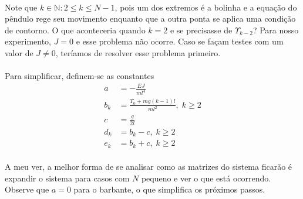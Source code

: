 \documentclass[a4paper,11pt]{scrartcl} %
\numberwithin{equation}{section} %
\numberwithin{figure}{section} %
\numberwithin{table}{section} %
\begin{document}
\paragraph{} Note que $k\in \mathbb{N}:2\le k \le N-1$, pois um dos extremos é a bolinha e a equação do pêndulo rege seu movimento enquanto que a outra ponta se aplica uma condição de contorno. O que aconteceria quando $k=2$ e se precisasse de $\Upsilon_{k-2}$? Para nosso experimento, $J=0$ e esse problema não ocorre. Caso se façam testes com um valor de $J\neq 0$, teríamos de resolver esse problema primeiro.

\paragraph{} Para simplificar, definem-se as constantes \begin{align}
	a &= -\frac{EJ}{m l^4}\\
	b_k &= \frac{T_0 + mg(k-1)l}{m l^2},\; k\ge 2\\
	c &= \frac{g}{2l}\\
	d_k &= b_k - c,\; k\ge 2\\
	e_k &= b_k + c,\; k\ge 2
\end{align}

\paragraph{} A meu ver, a melhor forma de se analisar como as matrizes do sistema ficarão é expandir o sistema para casos com $N$ pequeno e ver o que está ocorrendo. Observe que $a=0$ para o barbante, o que simplifica os próximos passos.
\end{document}
